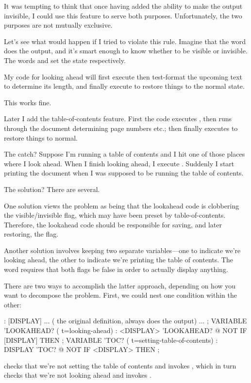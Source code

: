It was tempting to think that once having added the ability to make
the output invisible, I could use this feature to serve both purposes.
Unfortunately, the two purposes are not mutually exclusive.

Let's see what would happen if I tried to violate this rule. Imagine
that the word  does the output, and it's smart enough
to know whether to be visible or invisible. The words 
and  set the state respectively.

My code for looking ahead will first execute  then
test-format the upcoming text to determine its length, and finally
execute  to restore things to the normal state.

This works fine.

Later I add the table-of-contents feature. First the code executes
, then runs through the document determining page
numbers etc.; then finally executes  to restore things
to normal.

The catch? Suppose I'm running a table of contents and I hit one of
those places where I look ahead. When I finish looking ahead, I
execute . Suddenly I start printing the document when I
was supposed to be running the table of contents.

The solution? There are several.

One solution views the problem as being that the lookahead code is
clobbering the visible/invisible flag, which may have been preset by
table-of-contents. Therefore, the lookahead code should be responsible for
saving, and later restoring, the flag.

Another solution involves keeping two separate variables---one to
indicate we're looking ahead, the other to indicate we're printing the
table of contents. The word  requires that both flags
be false in order to actually display anything.

There are two ways to accomplish the latter approach, depending on
how you want to decompose the problem. First, we could nest one condition
within the other:

\begin{Code}
: [DISPLAY]  ...
     ( the original definition, always does the output) ... ;
VARIABLE 'LOOKAHEAD?  ( t=looking-ahead)
: <DISPLAY>   'LOOKAHEAD? @ NOT IF  [DISPLAY]  THEN ;
VARIABLE 'TOC?  ( t=setting-table-of-contents)
: DISPLAY   'TOC? @ NOT IF  <DISPLAY>  THEN ;
\end{Code}
{\sloppy
{} checks that we're not setting the table of contents
and invokes , which in turn checks that we're not
looking ahead and invokes \forth{[DISPLAY]}.

}

